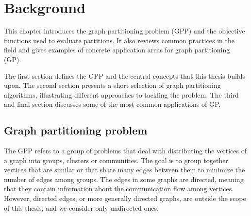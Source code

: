 \chapter{Background}
This chapter introduces the graph partitioning problem (GPP) and the objective functions used to evaluate partitions. It also reviews common practices in the field and gives examples of concrete application areas for graph partitioning (GP).

The first section defines the GPP and the central concepts that this thesis builds upon. The second section presents a short selection of graph partitioning algorithms, illustrating different approaches to tackling the problem. The third and final section discusses some of the most common applications of GP.

\section{Graph partitioning problem} \label{sec:gpp}
The GPP refers to a group of problems that deal with distributing the vertices of a graph into groups, clusters or communities. The goal is to group together vertices that are similar or that share many edges between them to minimize the number of edges among groups. The edges in some graphs are directed, meaning that they contain information about the communication flow among vertices. However, directed edges, or more generally directed graphs, are outside the scope of this thesis, and we consider only undirected ones.

